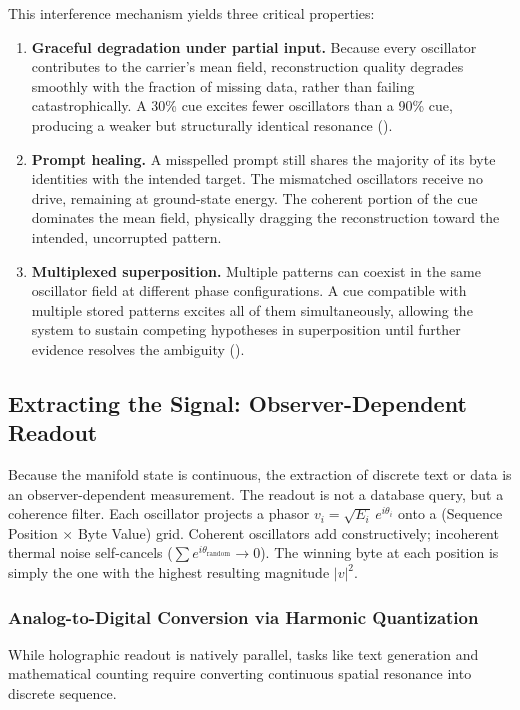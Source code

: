 \documentclass[11pt,a4paper]{article}
\begin{document}
This interference mechanism yields three critical properties:
\begin{enumerate}[nosep]
  \item \textbf{Graceful degradation under partial input.} Because every oscillator contributes to the carrier's mean field, reconstruction quality degrades smoothly with the fraction of missing data, rather than failing catastrophically. A 30\% cue excites fewer oscillators than a 90\% cue, producing a weaker but structurally identical resonance ().
  \item \textbf{Prompt healing.} A misspelled prompt still shares the majority of its byte identities with the intended target. The mismatched oscillators receive no drive, remaining at ground-state energy. The coherent portion of the cue dominates the mean field, physically dragging the reconstruction toward the intended, uncorrupted pattern. 
  \item \textbf{Multiplexed superposition.} Multiple patterns can coexist in the same oscillator field at different phase configurations. A cue compatible with multiple stored patterns excites all of them simultaneously, allowing the system to sustain competing hypotheses in superposition until further evidence resolves the ambiguity ().
\end{enumerate}

\FloatBarrier

\subsection{Extracting the Signal: Observer-Dependent Readout}
\label{sec:inference}

Because the manifold state is continuous, the extraction of discrete text or data is an observer-dependent measurement. The readout is not a database query, but a coherence filter. Each oscillator projects a phasor $v_i = \sqrt{E_i}\,e^{i\theta_i}$ onto a (Sequence Position $\times$ Byte Value) grid. Coherent oscillators add constructively; incoherent thermal noise self-cancels ($\sum e^{i\theta_{\text{random}}} \to 0$). The winning byte at each position is simply the one with the highest resulting magnitude $|v|^2$.

\subsubsection{Analog-to-Digital Conversion via Harmonic Quantization}
\label{sec:overtone_locking}
While holographic readout is natively parallel, tasks like text generation and mathematical counting require converting continuous spatial resonance into discrete sequence. 
\end{document}

